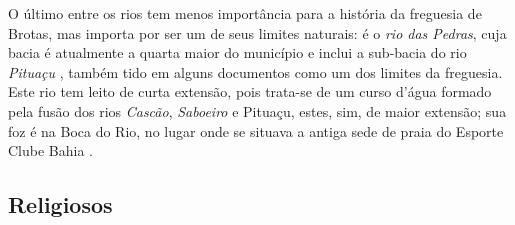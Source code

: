 O último entre os rios tem menos importância para a história da freguesia de Brotas, mas importa por ser um de seus limites naturais: é o \textit{rio das Pedras}, cuja bacia é atualmente a quarta maior do município e inclui a sub-bacia do rio \textit{Pituaçu} \cite[p.~175]{santos_aguas_2010}, também tido em alguns documentos como um dos limites da freguesia. Este rio tem leito de curta extensão, pois trata-se de um curso d'água formado pela fusão dos rios \textit{Cascão}, \textit{Saboeiro} e Pituaçu, estes, sim, de maior extensão; sua foz é na Boca do Rio, no lugar onde se situava a antiga sede de praia do Esporte Clube Bahia \cite[p.~175]{santos_aguas_2010}.

\subsection{Religiosos}\label{subsec:pontrel}

